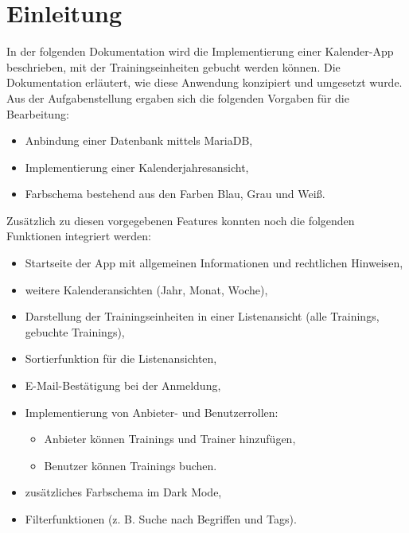 \chapter{Einleitung}

In der folgenden Dokumentation wird die Implementierung einer Kalender-App beschrieben, mit der Trainingseinheiten gebucht
 werden können. Die Dokumentation erläutert, wie diese Anwendung konzipiert und umgesetzt wurde. Aus der Aufgabenstellung ergaben 
 sich die folgenden Vorgaben für die Bearbeitung:

\begin{itemize}
    \item Anbindung einer Datenbank mittels MariaDB,
    \item Implementierung einer Kalenderjahresansicht,
    \item Farbschema bestehend aus den Farben Blau, Grau und Weiß.
\end{itemize}

Zusätzlich zu diesen vorgegebenen Features konnten noch die folgenden Funktionen integriert werden:

\begin{itemize}
    \item Startseite der App mit allgemeinen Informationen und rechtlichen Hinweisen,
    \item weitere Kalenderansichten (Jahr, Monat, Woche),
    \item Darstellung der Trainingseinheiten in einer Listenansicht (alle Trainings, gebuchte Trainings),
    \item Sortierfunktion für die Listenansichten,
    \item E-Mail-Bestätigung bei der Anmeldung,
    \item Implementierung von Anbieter- und Benutzerrollen:
    \begin{itemize}
        \item Anbieter können Trainings und Trainer hinzufügen,
        \item Benutzer können Trainings buchen.
    \end{itemize}
    \item zusätzliches Farbschema im Dark Mode,
    \item Filterfunktionen (z. B. Suche nach Begriffen und Tags).
\end{itemize}
